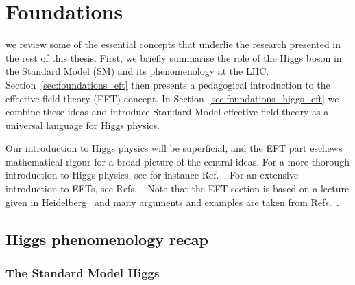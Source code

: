 




\chapter{Foundations}
\label{chapter:foundations}

 we review some of the essential concepts
that underlie the research presented in the rest of this thesis. First, we
briefly summarise the role of the Higgs boson in the Standard Model
(SM) and its phenomenology at the LHC.
Section~\ref{sec:foundations_eft} then presents a pedagogical
introduction to the effective field theory (EFT) concept. In
Section~\ref{sec:foundations_higgs_eft} we combine these ideas and
introduce Standard Model effective field theory as a universal
language for Higgs physics.

Our introduction to Higgs physics will be superficial, and the EFT
part eschews mathematical rigour for a broad picture of the central
ideas. For a more thorough introduction to Higgs physics, see for
instance Ref.~\cite{Plehn:2009nd}. For an extensive introduction to
EFTs, see Refs.~\cite{Georgi:1994qn,Kaplan:2005es}. Note that the EFT
section is based on a lecture given in
Heidelberg~\cite{Brehmer:EFTlecture} and many arguments and examples
are taken from Refs.~\cite{Georgi:1994qn,Kaplan:2005es}.





\section{Higgs phenomenology recap}
\label{sec:foundations_Higgs}


\subsection{The Standard Model Higgs}

